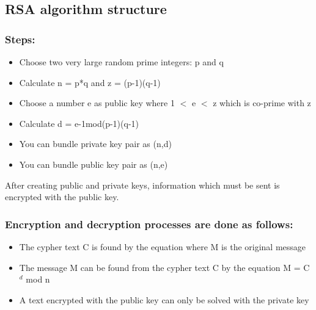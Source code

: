 \subsection{RSA algorithm structure}
\subsubsection{Steps:}
\vspace{-18pt}
\begin{itemize}
	\item Choose two very large random prime integers: p and q
	\item Calculate n = p*q and z = (p-1)(q-1)
	\item Choose a number e as public key where 1 $<$ e $<$ z which is co-prime with z
	\item Calculate d = e-1mod(p-1)(q-1)
	\item You can bundle private key pair as (n,d)
	\item You can bundle public key pair as (n,e)
\end{itemize}
After creating public and private keys, information which must be sent is encrypted with the
public key.
\subsubsection{Encryption and decryption processes are done as follows:}
\vspace{-18pt}
\begin{itemize}
	\item The cypher text C is found by the equation where M is the original
	      message
	\item The message M can be found from the cypher text C by the equation M = C$^d$ mod n
	\item A text encrypted with the public key can only be solved with the private key
\end{itemize}
